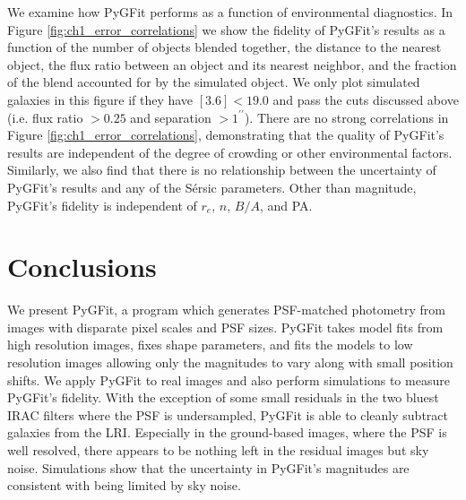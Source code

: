 \documentclass[apj]{emulateapj}
\newcommand{\sersic}{S\'{e}rsic}
\newcommand{\pygfit}{PyGFit}
\begin{document}
We examine how \pygfit{} performs as a function of environmental diagnostics.  In Figure \ref{fig:ch1_error_correlations} we show the fidelity of \pygfit{}'s results as a function of the number of objects blended together, the distance to the nearest object, the flux ratio between an object and its nearest neighbor, and the fraction of the blend accounted for by the simulated object.  We only plot simulated galaxies in this figure if they have $[3.6] < 19.0$ and pass the cuts discussed above (i.e. flux ratio $>0.25$ and separation $>1^{\prime\prime}$).  There are no strong correlations in Figure \ref{fig:ch1_error_correlations}, demonstrating that the quality of \pygfit{}'s results are independent of the degree of crowding or other environmental factors.  Similarly, we also find that there is no relationship between the uncertainty of \pygfit{}'s results and any of the \sersic{} parameters.  Other than magnitude, \pygfit{}'s fidelity is independent of $r_e$, $n$, $B/A$, and PA.


\section{Conclusions}\label{sec:conclusions}

We present \pygfit{}, a program which generates PSF-matched photometry from images with disparate pixel scales and PSF sizes.  \pygfit{} takes model fits from high resolution images, fixes shape parameters, and fits the models to low resolution images allowing only the magnitudes to vary along with small position shifts.  We apply \pygfit{} to real images and also perform simulations to measure \pygfit{}'s fidelity.  With the exception of some small residuals in the two bluest IRAC filters where the PSF is undersampled, \pygfit{} is able to cleanly subtract galaxies from the LRI.  Especially in the ground-based images, where the PSF is well resolved, there appears to be nothing left in the residual images but sky noise.  Simulations show that the uncertainty in \pygfit{}'s magnitudes are consistent with being limited by sky noise.
\end{document}
